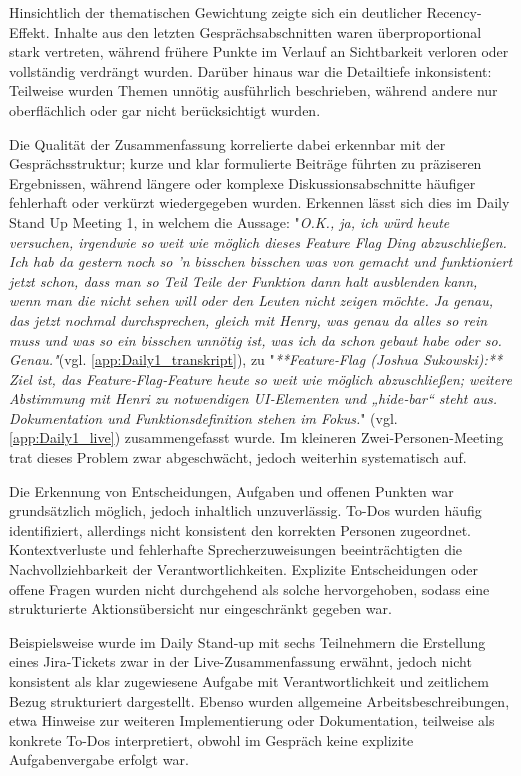 Hinsichtlich der thematischen Gewichtung zeigte sich ein deutlicher Recency-Effekt. Inhalte aus den letzten Gesprächsabschnitten waren überproportional stark vertreten, während frühere Punkte im Verlauf an Sichtbarkeit verloren oder vollständig verdrängt wurden. Darüber hinaus war die Detailtiefe inkonsistent: Teilweise wurden Themen unnötig ausführlich beschrieben, während andere nur oberflächlich oder gar nicht berücksichtigt wurden. 

Die Qualität der Zusammenfassung korrelierte dabei erkennbar mit der Gesprächsstruktur; kurze und klar formulierte Beiträge führten zu präziseren Ergebnissen, während längere oder komplexe Diskussionsabschnitte häufiger fehlerhaft oder verkürzt wiedergegeben wurden. Erkennen lässt sich dies im Daily Stand Up Meeting 1, in welchem die Aussage: "\textit{O.K., ja, ich würd heute versuchen, irgendwie so weit wie möglich dieses Feature Flag Ding abzuschließen. Ich hab da gestern noch so 'n bisschen bisschen was von gemacht und funktioniert jetzt schon, dass man so Teil Teile der Funktion dann halt ausblenden kann, wenn man die nicht sehen will oder den Leuten nicht zeigen möchte. Ja genau, das jetzt nochmal durchsprechen, gleich mit Henry, was genau da alles so rein muss und was so ein bisschen unnötig ist, was ich da schon gebaut habe oder so. Genau."}(vgl. \ref{app:Daily1_transkript}), zu "\textit{**Feature‑Flag (Joshua Sukowski):** Ziel ist, das Feature‑Flag‑Feature heute so weit wie möglich abzuschließen; weitere Abstimmung mit Henri zu notwendigen UI‑Elementen und „hide‑bar“ steht aus. Dokumentation und Funktionsdefinition stehen im Fokus.}" (vgl. \ref{app:Daily1_live}) zusammengefasst wurde. Im kleineren Zwei-Personen-Meeting trat dieses Problem zwar abgeschwächt, jedoch weiterhin systematisch auf.

Die Erkennung von Entscheidungen, Aufgaben und offenen Punkten war grundsätzlich möglich, jedoch inhaltlich unzuverlässig. To-Dos wurden häufig identifiziert, allerdings nicht konsistent den korrekten Personen zugeordnet. Kontextverluste und fehlerhafte Sprecherzuweisungen beeinträchtigten die Nachvollziehbarkeit der Verantwortlichkeiten. Explizite Entscheidungen oder offene Fragen wurden nicht durchgehend als solche hervorgehoben, sodass eine strukturierte Aktionsübersicht nur eingeschränkt gegeben war.

Beispielsweise wurde im Daily Stand-up mit sechs Teilnehmern die Erstellung eines Jira-Tickets zwar in der Live-Zusammenfassung erwähnt, jedoch nicht konsistent als klar zugewiesene Aufgabe mit Verantwortlichkeit und zeitlichem Bezug strukturiert dargestellt. Ebenso wurden allgemeine Arbeitsbeschreibungen, etwa Hinweise zur weiteren Implementierung oder Dokumentation, teilweise als konkrete To-Dos interpretiert, obwohl im Gespräch keine explizite Aufgabenvergabe erfolgt war.

